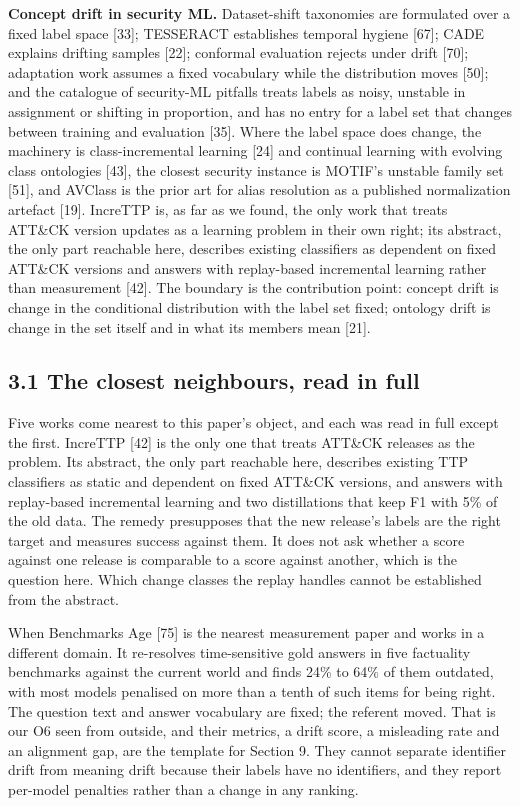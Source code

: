 \documentclass[11pt,a4paper]{article}
\begin{document}
\textbf{Concept drift in security ML.} Dataset-shift taxonomies are formulated over a fixed label space [33]; TESSERACT establishes temporal hygiene [67]; CADE explains drifting samples [22]; conformal evaluation rejects under drift [70]; adaptation work assumes a fixed vocabulary while the distribution moves [50]; and the catalogue of security-ML pitfalls treats labels as noisy, unstable in assignment or shifting in proportion, and has no entry for a label set that changes between training and evaluation [35]. Where the label space does change, the machinery is class-incremental learning [24] and continual learning with evolving class ontologies [43], the closest security instance is MOTIF's unstable family set [51], and AVClass is the prior art for alias resolution as a published normalization artefact [19]. IncreTTP is, as far as we found, the only work that treats ATT\&CK version updates as a learning problem in their own right; its abstract, the only part reachable here, describes existing classifiers as dependent on fixed ATT\&CK versions and answers with replay-based incremental learning rather than measurement [42]. The boundary is the contribution point: concept drift is change in the conditional distribution with the label set fixed; ontology drift is change in the set itself and in what its members mean [21].

\subsection{3.1 The closest neighbours, read in full}

Five works come nearest to this paper's object, and each was read in full except the first. IncreTTP [42] is the only one that treats ATT\&CK releases as the problem. Its abstract, the only part reachable here, describes existing TTP classifiers as static and dependent on fixed ATT\&CK versions, and answers with replay-based incremental learning and two distillations that keep F1 with 5\% of the old data. The remedy presupposes that the new release's labels are the right target and measures success against them. It does not ask whether a score against one release is comparable to a score against another, which is the question here. Which change classes the replay handles cannot be established from the abstract.

When Benchmarks Age [75] is the nearest measurement paper and works in a different domain. It re-resolves time-sensitive gold answers in five factuality benchmarks against the current world and finds 24\% to 64\% of them outdated, with most models penalised on more than a tenth of such items for being right. The question text and answer vocabulary are fixed; the referent moved. That is our O6 seen from outside, and their metrics, a drift score, a misleading rate and an alignment gap, are the template for Section 9. They cannot separate identifier drift from meaning drift because their labels have no identifiers, and they report per-model penalties rather than a change in any ranking.
\end{document}
